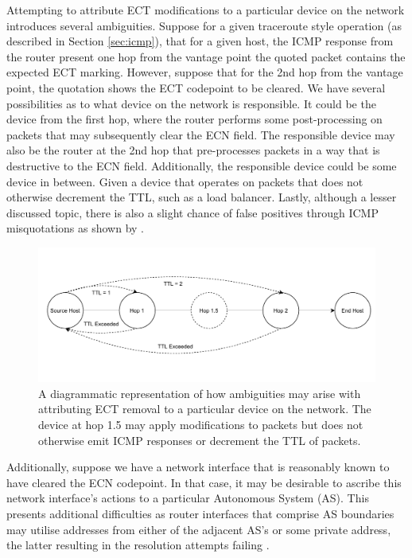 \documentclass{l4proj}
\begin{document}
Attempting to attribute ECT modifications to a particular device on the network introduces several ambiguities. Suppose for a given traceroute style operation (as described in Section \ref{sec:icmp}), that for a given host, the ICMP response from the router present one hop from the vantage point the quoted packet contains the expected ECT marking. However, suppose that for the 2nd hop from the vantage point, the quotation shows the ECT codepoint to be cleared. We have several possibilities as to what device on the network is responsible. It could be the device from the first hop, where the router performs some post-processing on packets that may subsequently clear the ECN field. The responsible device may also be the router at the 2nd hop that pre-processes packets in a way that is destructive to the ECN field. Additionally, the responsible device could be some device in between. Given a device that operates on packets that does not otherwise decrement the TTL, such as a load balancer. Lastly, although a lesser discussed topic, there is also a slight chance of false positives through ICMP misquotations as shown by \cite{malone_analysis_2007}.

\begin{figure}[H]
\centering
\includegraphics[width=14cm,keepaspectratio]{dissertation/images/ambig_icmp.pdf}
\caption{A diagrammatic representation of how ambiguities may arise with attributing ECT removal to a particular device on the network. The device at hop 1.5 may apply modifications to packets but does not otherwise emit ICMP responses or decrement the TTL of packets.}
\label{fig:icmpambig}
\end{figure}

Additionally, suppose we have a network interface that is reasonably known to have cleared the ECN codepoint. In that case, it may be desirable to ascribe this network interface's actions to a particular Autonomous System (AS). This presents additional difficulties as router interfaces that comprise AS boundaries may utilise addresses from either of the adjacent AS's or some private address, the latter resulting in the resolution attempts failing \cite{mcquistin_is_2015}.
\end{document}
